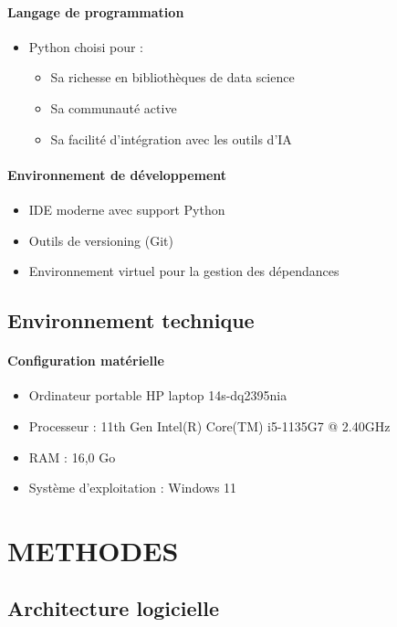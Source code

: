 \paragraph{Langage de programmation}
\begin{itemize}
    \item Python choisi pour :
    \begin{itemize}
        \item Sa richesse en bibliothèques de data science
        \item Sa communauté active
        \item Sa facilité d'intégration avec les outils d'IA
    \end{itemize}
\end{itemize}

\paragraph{Environnement de développement}
\begin{itemize}
    \item IDE moderne avec support Python
    \item Outils de versioning (Git)
    \item Environnement virtuel pour la gestion des dépendances
\end{itemize}

\subsection{Environnement technique}

\paragraph{Configuration matérielle}
\begin{itemize}
    \item Ordinateur portable HP laptop 14s-dq2395nia
    \item Processeur : 11th Gen Intel(R) Core(TM) i5-1135G7 @ 2.40GHz
    \item RAM : 16,0 Go
    \item Système d'exploitation : Windows 11
\end{itemize}

\section{METHODES}

\subsection{Architecture logicielle}

